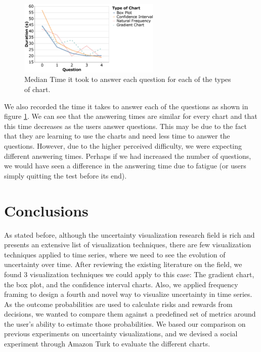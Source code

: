 \documentclass[a4paper,3p,sort&compress]{elsarticle}
\begin{document}
\begin{figure}
  \centering
   \includegraphics[width=0.6\textwidth]{duration_evo2}
  \caption{\label{figure:duration} Median Time it took to answer each question for each of the types of chart.}
\end{figure}  

We also recorded the time it takes to answer each of the questions as shown in figure \ref{figure:duration}. We 
can see that the answering times are similar for every chart and that this time decreases as the users answer questions.
This may be due to the fact that they are learning to use the charts and need less time to answer the questions.
However, due to the higher perceived difficulty, we were expecting different answering times. Perhaps if we had 
increased the number of questions, we would have seen a difference in the answering time due to fatigue (or users simply quitting the test 
before its end).


\section{Conclusions}
\label{sec:concl}

As stated before, although the uncertainty visualization research field is rich and presents an extensive list of visualization techniques, 
there are few 
visualization techniques applied to time series, where we need to see the evolution of uncertainty 
over time. After reviewing the existing literature on the field, we found 3 visualization techniques we could apply to this case:
The gradient chart, the box plot, and the confidence interval charts. Also, we applied frequency framing 
to design a fourth and novel way to visualize uncertainty in time series.
As the outcome probabilities are used to calculate risks and rewards from decisions, we wanted to compare them against a predefined set of 
metrics around the user's ability to estimate those probabilities.
We based our comparison on previous experiments on uncertainty visualizations, and we devised a social experiment through Amazon Turk to 
evaluate the different charts.
\end{document}
